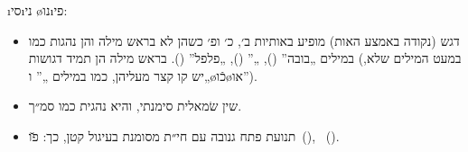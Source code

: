 \begin{framed}
\i{סי}\i{ני} \o{נו}\i{פי}:
\begin{itemize}
	\item דגש (נקודה באמצע האות) מופיע באותיות ב׳, כ׳ ופ׳ כשהן לא בראש מילה והן נהגות כמו במילים „בובה” (), „” (), „פלפל” (). בראש מילה הן תמיד דגושות (במעט המילים שלא, יש קו קצר מעליהן, כמו במילים „” ו„\o{כֿו}\o{או}”).
	\item שין שׂמאלית סימנתי, והיא נהגית כמו סמ״ך.
	\item תנועת פתח גנובה עם חי״ת מסומנת בעיגול קטן, כך: \u{פו}\gnuva {}~(), \gnuva {}~().
\end{itemize}

\end{framed}

	





